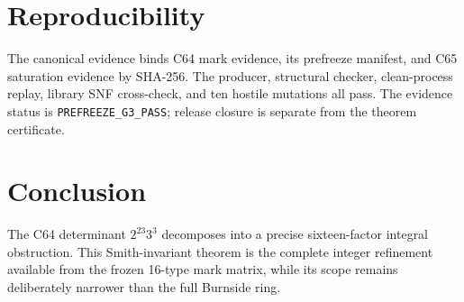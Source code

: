 \documentclass[10pt]{article}
\begin{document}
\section{Reproducibility}
The canonical evidence binds C64 mark evidence, its prefreeze manifest, and
C65 saturation evidence by SHA-256.  The producer, structural checker,
clean-process replay, library SNF cross-check, and ten hostile mutations all
pass.  The evidence status is \texttt{PREFREEZE\_G3\_PASS}; release closure is
separate from the theorem certificate.

\section{Conclusion}
The C64 determinant $2^{23}3^3$ decomposes into a precise sixteen-factor
integral obstruction.  This Smith-invariant theorem is the complete
integer refinement available from the frozen 16-type mark matrix, while its
scope remains deliberately narrower than the full Burnside ring.
\end{document}
